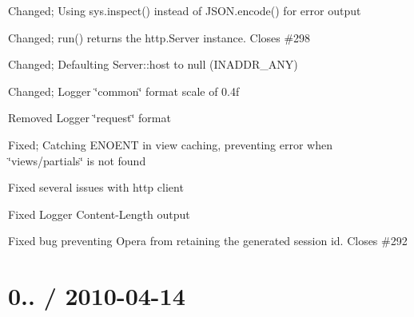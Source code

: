 {\begin{DoxyItemize}
\item Changed; Using sys.\+inspect() instead of J\+S\+O\+N.\+encode() for error output
\item Changed; run() returns the http.\+Server instance. Closes \#298
\item Changed; Defaulting Server\+::host to null (I\+N\+A\+D\+D\+R\+\_\+\+A\+NY)
\item Changed; Logger \char`\"{}common\char`\"{} format scale of 0.\+4f
\item Removed Logger \char`\"{}request\char`\"{} format
\item Fixed; Catching E\+N\+O\+E\+NT in view caching, preventing error when \char`\"{}views/partials\char`\"{} is not found
\item Fixed several issues with http client
\item Fixed Logger Content-\/\+Length output
\item Fixed bug preventing Opera from retaining the generated session id. Closes \#292
\end{DoxyItemize}}

{\ttfamily \section*{0.. / 2010-\/04-\/14 }}

{\ttfamily }

